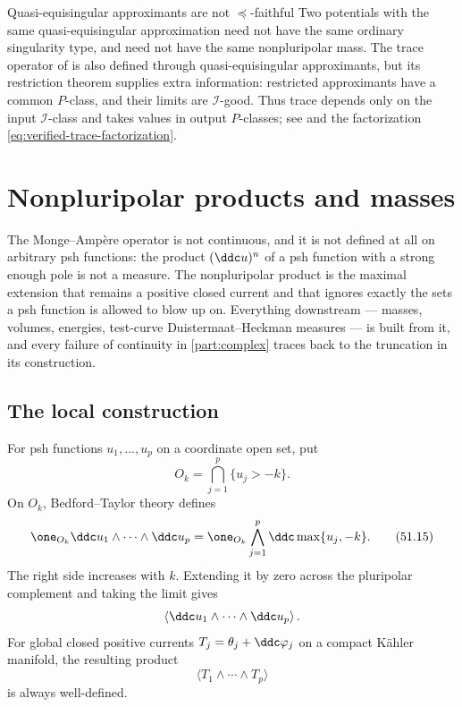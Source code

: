 \begin{warning}{Quasi-equisingular approximants are not
\texorpdfstring{\(\preceq\)}{order}-faithful}
\label{warn:ch51-qes}
Two potentials with the same quasi-equisingular approximation need not
have the same ordinary singularity type, and need not have the same
nonpluripolar mass.  The trace operator of
 is also defined through quasi-equisingular
approximants, but its restriction theorem supplies extra information:
restricted approximants have a common \(P\)-class, and their limits are
\(\mathcal I\)-good.  Thus trace depends only on the input
\(\mathcal I\)-class and takes values in output \(P\)-classes; see
and the factorization \eqref{eq:verified-trace-factorization}.
\end{warning}

\section{Nonpluripolar products and masses}
\label{sec:ch51-npp}

The Monge--Amp\`ere operator is not continuous, and it is not defined at
all on arbitrary psh functions: the product \((\ddc u)^n\) of a psh
function with a strong enough pole is not a measure.  The nonpluripolar
product is the maximal extension that remains a positive closed current
and that ignores exactly the sets a psh function is allowed to blow up on.
Everything downstream --- masses, volumes, energies, test-curve
Duistermaat--Heckman measures --- is built from it, and every failure of
continuity in \cref{part:complex} traces back to the truncation in its
construction.

\subsection{The local construction}
\label{sec:ch51-npp-local}

For psh functions \(u_1,\ldots,u_p\) on a coordinate open set, put
\[
 O_k=\bigcap_{j=1}^p\{u_j>-k\}.
\]
On \(O_k\), Bedford--Taylor theory defines
\[
 \one_{O_k}\ddc u_1\wedge\cdots\wedge\ddc u_p
 =
 \one_{O_k}\bigwedge_{j=1}^p\ddc\max\{u_j,-k\}.
\tag{51.15}\label{eq:complex-npp-truncation}
\]
The right side increases with \(k\).  Extending it by zero across the
pluripolar complement and taking the limit gives
\[
              \left\langle\ddc u_1\wedge\cdots\wedge\ddc u_p\right\rangle .
\]
For global closed positive currents \(T_j=\theta_j+\ddc\varphi_j\) on
a compact K\"ahler manifold, the resulting product
\[
       \langle T_1\wedge\cdots\wedge T_p\rangle
\tag{51.16}\label{eq:complex-global-npp}
\]
is always well-defined.

